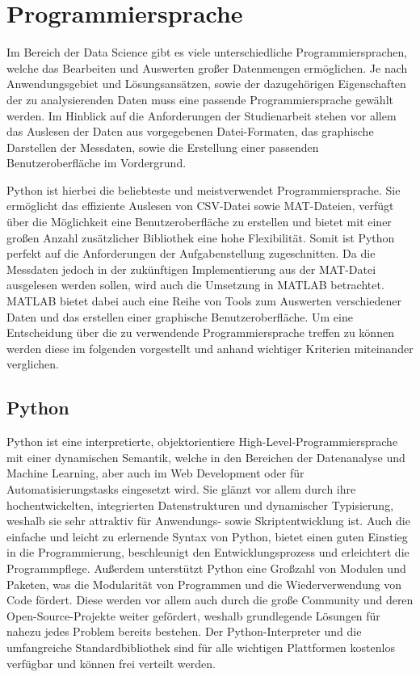 \section{Programmiersprache}

Im Bereich der Data Science gibt es viele unterschiedliche Programmiersprachen, welche das Bearbeiten und Auswerten großer Datenmengen ermöglichen. Je nach Anwendungsgebiet und Lösungsansätzen, sowie der dazugehörigen Eigenschaften der zu analysierenden Daten muss eine passende Programmiersprache gewählt werden. Im Hinblick auf die Anforderungen der Studienarbeit stehen vor allem das Auslesen der Daten aus vorgegebenen Datei-Formaten, das graphische Darstellen der Messdaten, sowie die Erstellung einer passenden Benutzeroberfläche im Vordergrund. 

Python ist hierbei die beliebteste und meistverwendet Programmiersprache. Sie ermöglicht das effiziente Auslesen von CSV-Datei sowie MAT-Dateien, verfügt über die Möglichkeit eine Benutzeroberfläche zu erstellen und bietet mit einer großen Anzahl zusätzlicher Bibliothek eine hohe Flexibilität. Somit ist Python perfekt auf die Anforderungen der Aufgabenstellung zugeschnitten. Da die Messdaten jedoch in der zukünftigen Implementierung aus der MAT-Datei ausgelesen werden sollen, wird auch die Umsetzung in MATLAB betrachtet. MATLAB bietet dabei auch eine Reihe von Tools zum Auswerten verschiedener Daten und das erstellen einer graphische Benutzeroberfläche. Um eine Entscheidung über die zu verwendende Programmiersprache treffen zu können werden diese im folgenden vorgestellt und anhand wichtiger Kriterien miteinander verglichen.

\subsection{Python}

Python ist eine interpretierte, objektorientiere High-Level-Programmiersprache mit einer dynamischen Semantik, welche in den Bereichen der Datenanalyse und Machine Learning, aber auch im Web Development oder für Automatisierungstasks eingesetzt wird. Sie glänzt vor allem durch ihre hochentwickelten, integrierten Datenstrukturen und dynamischer Typisierung, weshalb sie sehr attraktiv für Anwendungs- sowie Skriptentwicklung ist. Auch die einfache und leicht zu erlernende Syntax von Python, bietet einen guten Einstieg in die Programmierung, beschleunigt den Entwicklungsprozess und erleichtert die Programmpflege. Außerdem unterstützt Python eine Großzahl von Modulen und Paketen, was die Modularität von Programmen und die Wiederverwendung von Code fördert. Diese werden vor allem auch durch die große Community und deren Open-Source-Projekte weiter gefördert, weshalb grundlegende Lösungen für nahezu jedes Problem bereits bestehen. Der Python-Interpreter und die umfangreiche Standardbibliothek sind für alle wichtigen Plattformen kostenlos verfügbar und können frei verteilt werden.

